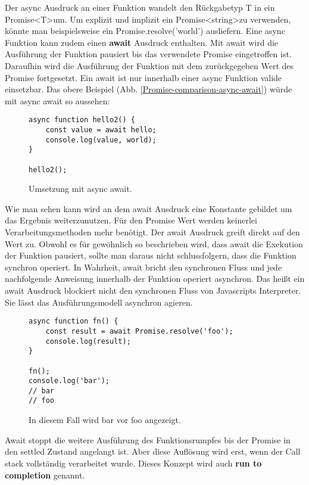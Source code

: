 \noindent
Der async Ausdruck an einer Funktion wandelt den Rückgabetyp T in ein Promise\textless T\textgreater um. Um explizit und implizit ein Promise\textless string\textgreater zu verwenden, könnte man beispielsweise ein Promise.resolve('world') ausliefern. Eine async Funktion kann zudem einen \textbf{await} Ausdruck enthalten. Mit await wird die Ausführung der Funktion pausiert bis das verwendete Promise eingetroffen ist. Daraufhin wird die Ausführung der Funktion mit dem zurückgegeben Wert des Promise fortgesetzt. Ein await ist nur innerhalb einer async Funktion valide einsetzbar. Das obere Beispiel (Abb. \ref{Promise-comparison-async-await}) würde mit async await so aussehen:

\begin{figure}[H]
\begin{lstlisting}[basicstyle=\small]
async function hello2() {
    const value = await hello;
    console.log(value, world);
}

hello2();
\end{lstlisting}
\caption{Umsetzung mit async await.}
\end{figure}

\noindent
Wie man sehen kann wird an dem await Ausdruck eine Konstante gebildet um das Ergebnis weiterzunutzen. Für den Promise Wert werden keinerlei Verarbeitungsmethoden mehr benötigt. Der await Ausdruck greift direkt auf den Wert zu. Obwohl es für gewöhnlich so beschrieben wird, dass await die Exekution der Funktion pausiert, sollte man daraus nicht schlussfolgern, dass die Funktion synchron operiert. In Wahrheit, await bricht den synchronen Fluss und jede nachfolgende Anweisung innerhalb der Funktion operiert asynchron. Das heißt ein await Ausdruck blockiert nicht den synchronen Fluss von Javascripts Interpreter. Sie lässt das Ausführungsmodell asynchron agieren.

\begin{figure}[H]
\begin{lstlisting}[basicstyle=\small]
async function fn() {
    const result = await Promise.resolve('foo');
    console.log(result);
}

fn();
console.log('bar');
// bar
// foo
\end{lstlisting}
\caption{In diesem Fall wird bar vor foo angezeigt.}
\end{figure}

\noindent
Await stoppt die weitere Ausführung des Funktionsrumpfes bis der Promise in den settled Zustand angelangt ist. Aber diese Auflösung wird erst, wenn der Call stack vollständig verarbeitet wurde. Dieses Konzept wird auch \textbf{run to completion} genannt.\\

